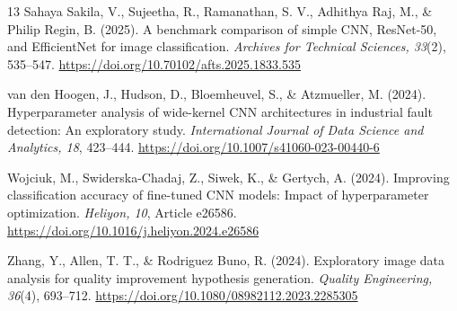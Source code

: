 \documentclass[conference]{IEEEtran}
\begin{document}
\begin{thebibliography}{13}
Sahaya Sakila, V., Sujeetha, R., Ramanathan, S. V., Adhithya Raj, M., \& Philip Regin, B. (2025). A benchmark comparison of simple CNN, ResNet-50, and EfficientNet for image classification. \textit{Archives for Technical Sciences, 33}(2), 535--547. \url{https://doi.org/10.70102/afts.2025.1833.535}

van den Hoogen, J., Hudson, D., Bloemheuvel, S., \& Atzmueller, M. (2024). Hyperparameter analysis of wide-kernel CNN architectures in industrial fault detection: An exploratory study. \textit{International Journal of Data Science and Analytics, 18}, 423--444. \url{https://doi.org/10.1007/s41060-023-00440-6}

Wojciuk, M., Swiderska-Chadaj, Z., Siwek, K., \& Gertych, A. (2024). Improving classification accuracy of fine-tuned CNN models: Impact of hyperparameter optimization. \textit{Heliyon, 10}, Article e26586. \url{https://doi.org/10.1016/j.heliyon.2024.e26586}

Zhang, Y., Allen, T. T., \& Rodriguez Buno, R. (2024). Exploratory image data analysis for quality improvement hypothesis generation. \textit{Quality Engineering, 36}(4), 693--712. \url{https://doi.org/10.1080/08982112.2023.2285305}

\end{thebibliography}
\end{document}
